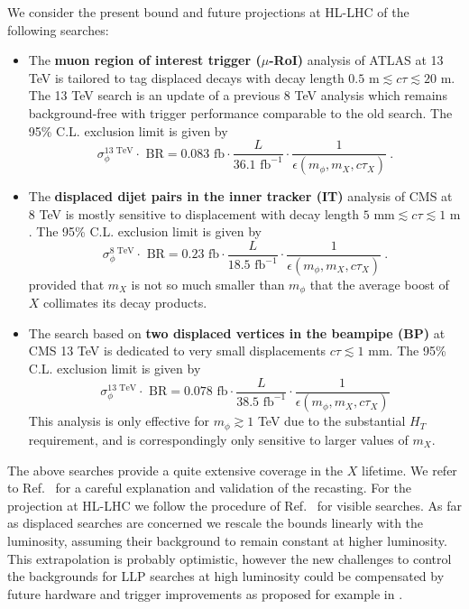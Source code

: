 We consider the present bound and future projections at HL-LHC of the following searches:
\begin{itemize}
\item The {\bf muon region of interest trigger ($\mu$-RoI)}  analysis of  ATLAS at 13 TeV \cite{Aaboud:2018aqj} is tailored to tag displaced decays with decay length $0.5\text{ m}\lesssim c\tau\lesssim 20\text{ m}$. The 13 TeV search is an update of a previous 8 TeV analysis \cite{Aad:2015uaa} which remains background-free with trigger performance comparable to the old search. The 95\% C.L. exclusion limit is given by 
\begin{equation}
\sigma_\phi^{13\text{ TeV}}\cdot\text{ BR}=  0.083\text{ fb}\cdot \frac{L}{36.1\text{ fb}^{-1}}\cdot \frac{1}{\epsilon(m_\phi,m_X,c\tau_X)}\ .
\end{equation}
\item The { \bf displaced dijet pairs in the inner tracker (IT)} analysis of CMS at 8 TeV \cite{CMS:2014wda} is mostly sensitive to displacement with decay length $\text{5 mm}\lesssim c\tau\lesssim 1 \text{ m}$. The 95\% C.L. exclusion limit is given by 
\begin{equation} 
\sigma_\phi^{8\text{ TeV}}\cdot\text{ BR}= 0.23\text{ fb}\cdot \frac{L}{18.5\text{ fb}^{-1}}\cdot \frac{1}{\epsilon(m_\phi,m_X,c\tau_X)} \ .
\end{equation}
provided that $m_X$ is not so much smaller than $m_\phi$ that the average boost of $X$ collimates its decay products.
\item The search based on { \bf two  displaced vertices in the beampipe (BP)} at CMS 13 TeV \cite{Sirunyan:2018pwn} is dedicated to very small displacements $c\tau\lesssim 1\text{ mm}$. The 95\% C.L. exclusion limit is given by 
\begin{equation}
\sigma_\phi^{13\text{ TeV}}\cdot\text{ BR}= 0.078\text{ fb}\cdot \frac{L}{38.5\text{ fb}^{-1}}\cdot \frac{1}{\epsilon(m_\phi,m_X,c\tau_X)}
\end{equation}
This analysis is only effective for $m_\phi \gtrsim 1$ TeV due to the substantial $H_T$ requirement, and is correspondingly only sensitive to larger values of $m_X$.
\end{itemize}
The above searches provide a quite extensive coverage in the $X$ lifetime. We refer to Ref.~\cite{Alipour-fard:2018mre} for a careful explanation and validation of the recasting. For the projection at HL-LHC we follow the procedure of Ref.~\cite{Thamm:2015zwa,Buttazzo:2015bka} for visible searches. As far as displaced searches are concerned we rescale the bounds linearly with the luminosity, assuming their background to remain constant at higher luminosity. This extrapolation is probably optimistic, however the new challenges to control the backgrounds for LLP searches at high luminosity could be compensated  by future hardware and trigger improvements as proposed for example in \cite{Gershtein:2017tsv,Liu:2018wte}.

